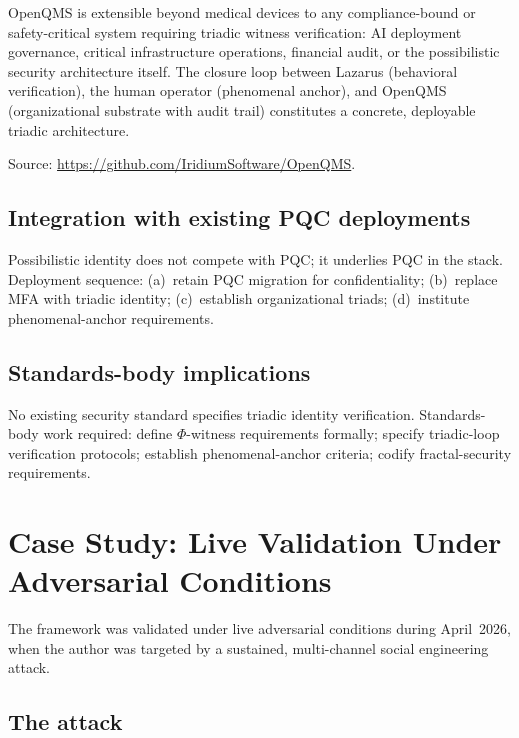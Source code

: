 \documentclass[11pt,a4paper]{article}
\theoremstyle{definition}
\theoremstyle{remark}
\begin{document}
OpenQMS is extensible beyond medical devices to any compliance-bound or safety-critical system requiring triadic witness verification: AI deployment governance, critical infrastructure operations, financial audit, or the possibilistic security architecture itself. The closure loop between Lazarus (behavioral verification), the human operator (phenomenal anchor), and OpenQMS (organizational substrate with audit trail) constitutes a concrete, deployable triadic architecture.

Source: \url{https://github.com/IridiumSoftware/OpenQMS}.

\subsection{Integration with existing PQC deployments}

Possibilistic identity does not compete with PQC; it underlies PQC in the stack. Deployment sequence: (a)~retain PQC migration for confidentiality; (b)~replace MFA with triadic identity; (c)~establish organizational triads; (d)~institute phenomenal-anchor requirements.

\subsection{Standards-body implications}

No existing security standard specifies triadic identity verification. Standards-body work required: define $\Phi$-witness requirements formally; specify triadic-loop verification protocols; establish phenomenal-anchor criteria; codify fractal-security requirements.

\section{Case Study: Live Validation Under Adversarial Conditions}
\label{sec:casestudy}

The framework was validated under live adversarial conditions during April~2026, when the author was targeted by a sustained, multi-channel social engineering attack.

\subsection{The attack}
\end{document}
